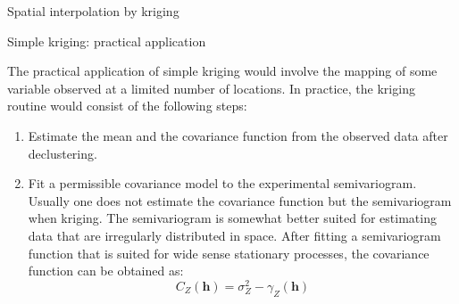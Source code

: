 \documentclass[8pt]{beamer}
\renewcommand{\emph}[1]{\textcolor{myorange}{#1}}
\begin{document}
 \begin{frame}{Spatial interpolation by kriging}
    \begin{block}{Simple kriging: practical application}
    \end{block}
    The practical application of \emph{simple kriging} would involve the mapping of some variable observed at a limited number of locations. In practice, the kriging routine would consist of the following steps: 
    \begin{enumerate} 
    \item Estimate the \emph{mean} and the \emph{covariance} function from the observed data after \emph{declustering}.
    \item Fit a permissible \emph{covariance model} to the \emph{experimental semivariogram}. Usually one does not estimate the \emph{covariance function} but the \emph{semivariogram} when \emph{kriging}. The \emph{semivariogram} is somewhat better suited for estimating data that are \emph{irregularly distributed} in space. After fitting a \emph{semivariogram function } that is suited for \emph{wide sense stationary processes}, the \emph{covariance function} can be obtained as:
            \begin{equation}
                C_Z (\mathbf{h}) = \sigma_Z^2 - \gamma_Z (\mathbf{h})
                \label{e519}
            \end{equation}
        
    \end{enumerate} 
    \end{frame}
\end{document}
